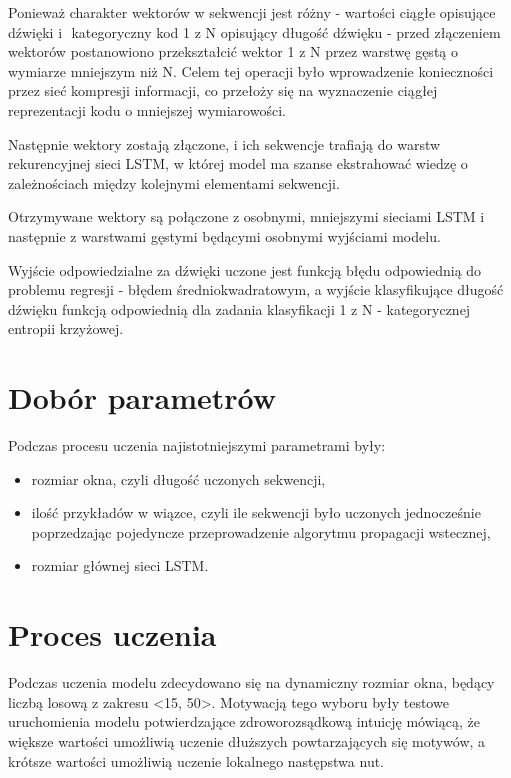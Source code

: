 {{        Ponieważ charakter wektorów w\,\,sekwencji jest różny - wartości ciągłe opisujące dźwięki i\,\,
        kategoryczny kod 1 z\,\,N opisujący długość dźwięku - przed złączeniem wektorów postanowiono 
        przekształcić wektor 1 z\,\,N przez warstwę gęstą o\,\,wymiarze mniejszym niż\,\,N. Celem tej operacji
        było wprowadzenie konieczności przez sieć kompresji informacji, co przełoży się 
        na wyznaczenie ciągłej reprezentacji kodu o\,\,mniejszej wymiarowości. 

        Następnie wektory zostają złączone, i\,\,ich sekwencje trafiają do warstw rekurencyjnej sieci LSTM,
        w\,\,której model ma szanse ekstrahować wiedzę o\,\,zależnościach między kolejnymi elementami sekwencji.

        Otrzymywane wektory są połączone z\,\,osobnymi, mniejszymi sieciami LSTM i\,\,następnie z\,\,warstwami 
        gęstymi będącymi osobnymi wyjściami modelu.
        
        Wyjście odpowiedzialne za dźwięki uczone jest funkcją błędu odpowiednią do problemu 
        regresji - błędem średniokwadratowym, a\,\,wyjście klasyfikujące długość dźwięku funkcją odpowiednią
        dla zadania klasyfikacji 1 z\,\,N - kategorycznej entropii krzyżowej.
    }

    \section{Dobór parametrów}
    {
        Podczas procesu uczenia najistotniejszymi parametrami były:
        \begin{itemize}
            \setlength\itemsep{-0.5em}
            \item rozmiar okna, czyli długość uczonych sekwencji,
            \item ilość przykładów w\,\,wiązce, czyli ile sekwencji było uczonych jednocześnie
            poprzedzając pojedyncze przeprowadzenie algorytmu propagacji wstecznej,
            \item rozmiar głównej sieci LSTM.
        \end{itemize}
    }

    \section{Proces uczenia}
    {
        Podczas uczenia modelu zdecydowano się na dynamiczny rozmiar okna,
        będący liczbą losową z\,\,zakresu <15, 50>. Motywacją tego wyboru były testowe 
        uruchomienia modelu potwierdzające zdroworozsądkową intuicję mówiącą, że większe wartości
        umożliwią uczenie dłuższych powtarzających się motywów, a\,\,krótsze wartości umożliwią uczenie lokalnego następstwa nut.

}}
